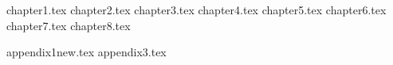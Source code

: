 \documentclass[a4paper,11pt]{book}
\begin{document}
 
\frontmatter

 
\clearpage
\thispagestyle{empty}
 
\tableofcontents
\listoffigures
\listoftables
 
\mainmatter

{chapter1.tex}
{chapter2.tex}
{chapter3.tex}
{chapter4.tex}
{chapter5.tex}
{chapter6.tex}
{chapter7.tex}
{chapter8.tex}

\appendix
{appendix1new.tex}
{appendix3.tex}

 

 
\backmatter


\printbibliography

 
\end{document}
